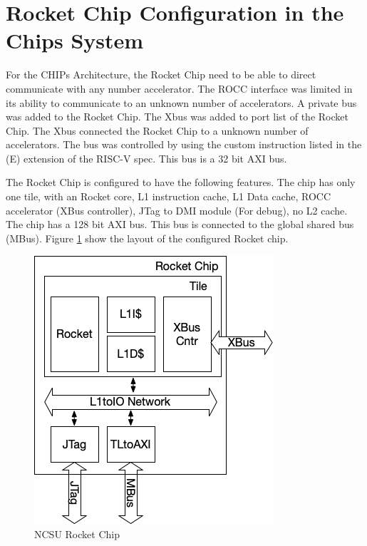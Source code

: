 \documentclass[../main.tex]{subfiles}
\begin{document}
\section{Rocket Chip Configuration in the Chips System}
For the CHIPs Architecture, the Rocket Chip need to be able to direct communicate with any number accelerator. The ROCC interface was limited in its ability to communicate to an unknown number of accelerators. A private bus was added to the Rocket Chip. The Xbus was added to port list of the Rocket Chip. The Xbus connected the Rocket Chip to a unknown number of accelerators. The bus was controlled by using the custom instruction listed in the (E) extension of the RISC-V spec. This bus is a 32 bit AXI bus.

The Rocket Chip is configured to have the following features. The chip has only one tile, with an Rocket core, L1 instruction cache, L1 Data cache, ROCC accelerator (XBus controller), JTag to DMI module (For debug), no L2 cache. The chip has a 128 bit AXI bus. This bus is connected to the global shared bus (MBus). Figure \ref{fig:RocketChip} show the layout of the configured Rocket chip.
\begin{figure}
    \centering
    \includegraphics[scale=.5]{pngs/RocketChip.png}
    \caption{NCSU Rocket Chip}
    \label{fig:RocketChip}
\end{figure}
\end{document}
